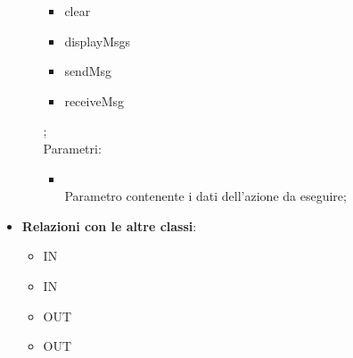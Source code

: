 \begin{itemize}
\begin{itemize}
\begin{itemize}
\item clear
\item displayMsgs
\item sendMsg
\item receiveMsg
\end{itemize};\\
		Parametri:
		\begin{itemize}
			\item {} \\
			Parametro contenente i dati dell'azione da eseguire;
		\end{itemize}
	\end{itemize}
	\item \textbf{Relazioni con le altre classi}:
	\begin{itemize}
		\item IN \hyperlink{ConversationApp_label}{}
		\item IN \hyperlink{ConversationView_label}{}
		\item OUT \hyperlink{ConversationAction_label}{}
		\item OUT \hyperlink{ConversationActionObserver_label}{}
	\end{itemize}
\end{itemize}
\FloatBarrier
\newpage
